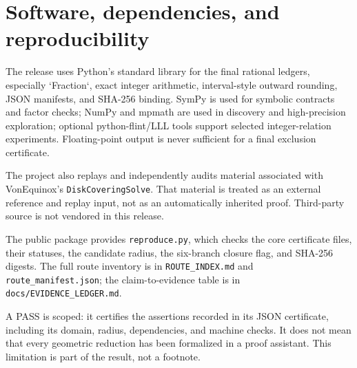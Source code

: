\section{Software, dependencies, and reproducibility}
The release uses Python's standard library for the final rational ledgers, especially `Fraction`, exact integer arithmetic, interval-style outward rounding, JSON manifests, and SHA-256 binding. SymPy is used for symbolic contracts and factor checks; NumPy and mpmath are used in discovery and high-precision exploration; optional python-flint/LLL tools support selected integer-relation experiments. Floating-point output is never sufficient for a final exclusion certificate.

The project also replays and independently audits material associated with VonEquinox's \texttt{DiskCoveringSolve}. That material is treated as an external reference and replay input, not as an automatically inherited proof. Third-party source is not vendored in this release.

The public package provides \texttt{reproduce.py}, which checks the core certificate files, their statuses, the candidate radius, the six-branch closure flag, and SHA-256 digests. The full route inventory is in \texttt{ROUTE\_INDEX.md} and \texttt{route\_manifest.json}; the claim-to-evidence table is in \texttt{docs/EVIDENCE\_LEDGER.md}.

A PASS is scoped: it certifies the assertions recorded in its JSON certificate, including its domain, radius, dependencies, and machine checks. It does not mean that every geometric reduction has been formalized in a proof assistant. This limitation is part of the result, not a footnote.
